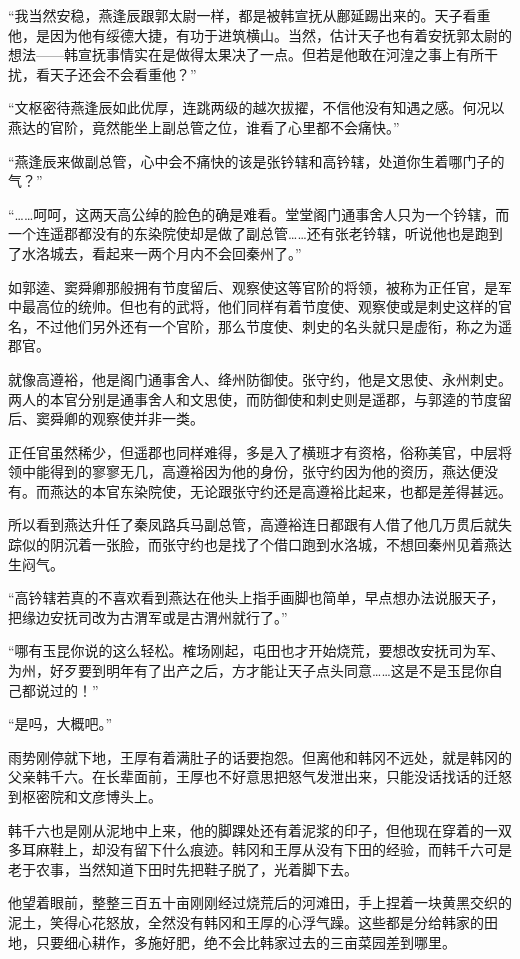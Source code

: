 “我当然安稳，燕逢辰跟郭太尉一样，都是被韩宣抚从鄜延踢出来的。天子看重他，是因为他有绥德大捷，有功于进筑横山。当然，估计天子也有着安抚郭太尉的想法——韩宣抚事情实在是做得太果决了一点。但若是他敢在河湟之事上有所干扰，看天子还会不会看重他？”

“文枢密待燕逢辰如此优厚，连跳两级的越次拔擢，不信他没有知遇之感。何况以燕达的官阶，竟然能坐上副总管之位，谁看了心里都不会痛快。”

“燕逢辰来做副总管，心中会不痛快的该是张钤辖和高钤辖，处道你生着哪门子的气？”

“……呵呵，这两天高公绰的脸色的确是难看。堂堂阁门通事舍人只为一个钤辖，而一个连遥郡都没有的东染院使却是做了副总管……还有张老钤辖，听说他也是跑到了水洛城去，看起来一两个月内不会回秦州了。”

如郭逵、窦舜卿那般拥有节度留后、观察使这等官阶的将领，被称为正任官，是军中最高位的统帅。但也有的武将，他们同样有着节度使、观察使或是刺史这样的官名，不过他们另外还有一个官阶，那么节度使、刺史的名头就只是虚衔，称之为遥郡官。

就像高遵裕，他是阁门通事舍人、绛州防御使。张守约，他是文思使、永州刺史。两人的本官分别是通事舍人和文思使，而防御使和刺史则是遥郡，与郭逵的节度留后、窦舜卿的观察使并非一类。

正任官虽然稀少，但遥郡也同样难得，多是入了横班才有资格，俗称美官，中层将领中能得到的寥寥无几，高遵裕因为他的身份，张守约因为他的资历，燕达便没有。而燕达的本官东染院使，无论跟张守约还是高遵裕比起来，也都是差得甚远。

所以看到燕达升任了秦凤路兵马副总管，高遵裕连日都跟有人借了他几万贯后就失踪似的阴沉着一张脸，而张守约也是找了个借口跑到水洛城，不想回秦州见着燕达生闷气。

“高钤辖若真的不喜欢看到燕达在他头上指手画脚也简单，早点想办法说服天子，把缘边安抚司改为古渭军或是古渭州就行了。”

“哪有玉昆你说的这么轻松。榷场刚起，屯田也才开始烧荒，要想改安抚司为军、为州，好歹要到明年有了出产之后，方才能让天子点头同意……这是不是玉昆你自己都说过的！”

“是吗，大概吧。”

雨势刚停就下地，王厚有着满肚子的话要抱怨。但离他和韩冈不远处，就是韩冈的父亲韩千六。在长辈面前，王厚也不好意思把怒气发泄出来，只能没话找话的迁怒到枢密院和文彦博头上。

韩千六也是刚从泥地中上来，他的脚踝处还有着泥浆的印子，但他现在穿着的一双多耳麻鞋上，却没有留下什么痕迹。韩冈和王厚从没有下田的经验，而韩千六可是老于农事，当然知道下田时先把鞋子脱了，光着脚下去。

他望着眼前，整整三百五十亩刚刚经过烧荒后的河滩田，手上捏着一块黄黑交织的泥土，笑得心花怒放，全然没有韩冈和王厚的心浮气躁。这些都是分给韩家的田地，只要细心耕作，多施好肥，绝不会比韩家过去的三亩菜园差到哪里。

